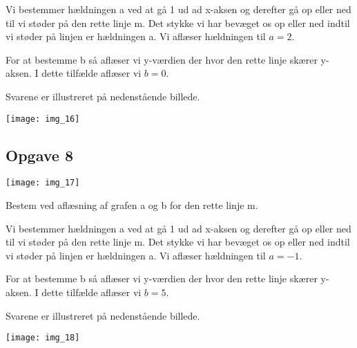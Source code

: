 Vi bestemmer hældningen a ved at gå 1 ud ad x-aksen og derefter gå op eller ned til vi støder på den rette linje m. Det stykke vi har bevæget os op eller ned indtil vi støder på linjen er hældningen a. Vi aflæser hældningen til $a = 2$.

For at bestemme b så aflæser vi y-værdien der hvor den rette linje skærer y-aksen. I dette tilfælde aflæser vi $b=0$.

Svarene er illustreret på nedenstående billede.

\texttt{[image: img\_16]}



\subsection{Opgave 8}

\texttt{[image: img\_17]}

Bestem ved aflæsning af grafen a og b for den rette linje m.

Vi bestemmer hældningen a ved at gå 1 ud ad x-aksen og derefter gå op eller ned til vi støder på den rette linje m. Det stykke vi har bevæget os op eller ned indtil vi støder på linjen er hældningen a. Vi aflæser hældningen til $a = -1$.

For at bestemme b så aflæser vi y-værdien der hvor den rette linje skærer y-aksen. I dette tilfælde aflæser vi $b=5$.

Svarene er illustreret på nedenstående billede.

\texttt{[image: img\_18]}

